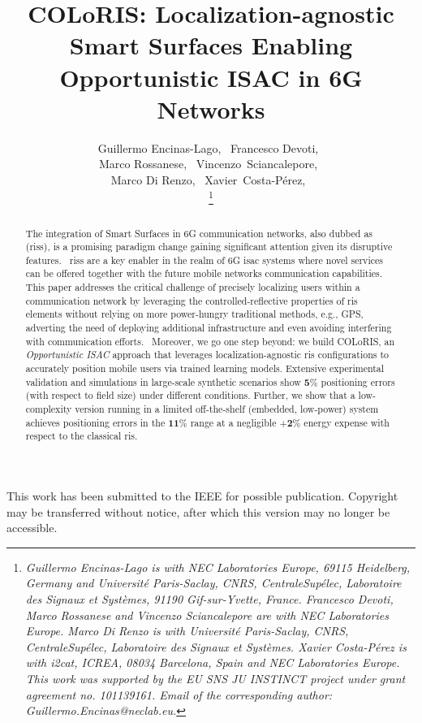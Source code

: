 \documentclass[10pt,journal,compsoc]{IEEEtran}
\newcommand{\name}{COLoRIS}
\begin{document}
\title{\name{}: Localization-agnostic Smart Surfaces Enabling Opportunistic ISAC in 6G Networks}

This work has been submitted to the IEEE for possible publication. Copyright may be transferred without notice, after which this version may no longer be accessible.


\author{Guillermo Encinas-Lago,~
Francesco Devoti,~ \\
Marco Rossanese,~
Vincenzo~Sciancalepore,~\\
Marco Di Renzo,~
Xavier~Costa-P\'erez,~

\thanks{\textit{Guillermo Encinas-Lago is with NEC Laboratories Europe, 69115 Heidelberg, Germany and Universit\'e Paris-Saclay, CNRS, CentraleSup\'elec, Laboratoire des Signaux et Syst\`emes, 91190 Gif-sur-Yvette, France. 
Francesco Devoti, Marco Rossanese and Vincenzo Sciancalepore are with NEC Laboratories Europe. 
Marco Di Renzo is with Universit\'e Paris-Saclay, CNRS, CentraleSup\'elec, Laboratoire des Signaux et Syst\`emes. 
Xavier Costa-P\'erez is with i2cat, ICREA, 08034 Barcelona, Spain and NEC Laboratories Europe.
This work was supported by the EU SNS JU INSTINCT project under grant agreement no. 101139161.\newline
Email of the corresponding author: Guillermo.Encinas@neclab.eu.}}
}


\maketitle


\begin{abstract}
The integration of Smart Surfaces in 6G communication networks, also dubbed as  (\glspl{ris}), is a promising paradigm change gaining significant attention given its disruptive features.
~\glspl{ris} are a key enabler in the realm of 6G \gls{isac} systems where novel services can be offered together with the future mobile networks communication capabilities.
This paper addresses the critical challenge of precisely localizing users within a communication network by leveraging the controlled-reflective properties of \gls{ris} elements 
without relying on more power-hungry traditional methods, e.g., GPS, adverting the need of deploying additional infrastructure and even avoiding interfering with communication efforts.
~Moreover, we go one step beyond: we build \name{}, an \emph{Opportunistic ISAC} approach that leverages localization-agnostic \gls{ris} configurations to accurately position mobile users via trained learning models. 
Extensive experimental validation and simulations in large-scale synthetic scenarios show $\textbf{5\%}$ positioning errors (with respect to field size) under different conditions.
Further, we show that a low-complexity version running in a limited off-the-shelf (embedded, low-power) system achieves positioning errors in the $\textbf{11\%}$ range  at a negligible $\textbf{+2\%}$ energy expense with respect to the classical \gls{ris}. 
\end{abstract}
\end{document}
